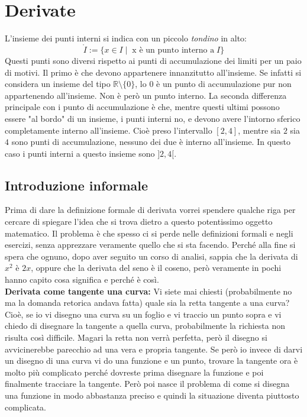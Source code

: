 \section{Derivate}

L'insieme dei punti interni si indica con un piccolo \textit{tondino} in alto:
\begin{equation*}
	\mathring{I} := \{x \in I \; | \;\; \text{x è un punto interno a}\;I\} 
\end{equation*}
Questi punti sono diversi rispetto ai punti di accumulazione dei limiti per un paio di motivi. Il primo è che devono appartenere innanzitutto all'insieme. Se infatti si considera un insieme del tipo $\mathbb{R} \setminus \{0\}$, lo $0$ è un punto di accumulazione pur non appartenendo all'insieme. Non è però un punto interno. La seconda differenza principale con i punto di accumulazione è che, mentre questi ultimi possono essere "al bordo" di un insieme, i punti interni no, e devono avere l'intorno sferico completamente interno all'insieme. Cioè preso l'intervallo $[2, 4]$, mentre sia $2$ sia $4$ sono punti di accumulazione, nessuno dei due è interno all'insieme. In questo caso i punti interni a questo insieme sono $]2,4[$.

\subsection{Introduzione informale}
Prima di dare la definizione formale di derivata vorrei spendere qualche riga per cercare di spiegare l'idea che si trova dietro a questo potentissimo oggetto matematico. Il problema è che spesso ci si perde nelle definizioni formali e negli esercizi, senza apprezzare veramente quello che si sta facendo. Perché alla fine si spera che ognuno, dopo aver seguito un corso di analisi, sappia che la derivata di $x^2$ è $2x$, oppure che la derivata del seno è il coseno, però veramente in pochi hanno capito cosa significa e perché è così.\\

\textbf{Derivata come tangente una curva:} Vi siete mai chiesti (probabilmente no ma la domanda retorica andava fatta) quale sia la retta tangente a una curva? Cioè, se io vi disegno una curva su un foglio e vi traccio un punto sopra e vi chiedo di disegnare la tangente a quella curva, probabilmente la richiesta non risulta così difficile. Magari la retta non verrà perfetta, però il disegno si avvicinerebbe parecchio ad una vera e propria tangente. Se però io invece di darvi un disegno di una curva vi do una funzione e un punto, trovare la tangente ora è molto più complicato perché dovreste prima disegnare la funzione e poi finalmente tracciare la tangente. Però poi nasce il problema di come si disegna una funzione in modo abbastanza preciso e quindi la situazione diventa piuttosto complicata. 

